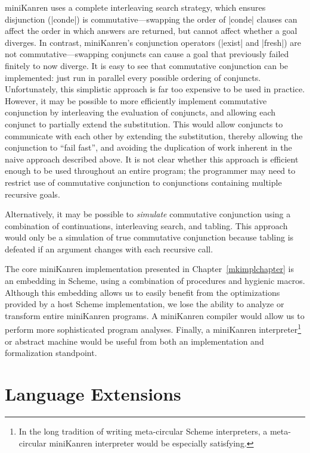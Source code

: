 miniKanren uses a complete interleaving search strategy, which ensures
disjunction (\scheme|conde|) is commutative---swapping the order of
\scheme|conde| clauses can affect the order in which answers are
returned, but cannot affect whether a goal diverges. In contrast,
miniKanren's conjunction operators (\scheme|exist| and \scheme|fresh|)
are not commutative---swapping conjuncts can cause a goal that
previously failed finitely to now diverge.  It is easy to see that
commutative conjunction can be implemented: just run in parallel every
possible ordering of conjuncts. Unfortunately, this simplistic
approach is far too expensive to be used in practice. However, it may
be possible to more efficiently implement commutative conjunction by
interleaving the evaluation of conjuncts, and allowing each conjunct
to partially extend the substitution. This would allow conjuncts to
communicate with each other by extending the substitution, thereby
allowing the conjunction to ``fail fast'', and avoiding the
duplication of work inherent in the naive approach described above.
It is not clear whether this approach is efficient enough to be used
throughout an entire program; the programmer may need to restrict use
of commutative conjunction to conjunctions containing multiple
recursive goals.

Alternatively, it may be possible to \emph{simulate} commutative
conjunction using a combination of continuations, interleaving search,
and tabling.  This approach would only be a simulation of true
commutative conjunction because tabling is defeated if an argument
changes with each recursive call.

The core miniKanren implementation presented in
Chapter~\ref{mkimplchapter} is an embedding in Scheme, using a
combination of procedures and hygienic macros.  Although this
embedding allows us to easily benefit from the optimizations provided
by a host Scheme implementation, we lose the ability to analyze or
transform entire miniKanren programs. A miniKanren compiler would
allow us to perform more sophisticated program analyses. Finally, a
miniKanren interpreter\footnote{In the long tradition of writing
  meta-circular Scheme interpreters, a meta-circular miniKanren
  interpreter would be especially satisfying.} or abstract machine
would be useful from both an implementation and formalization
standpoint.


\section{Language Extensions}\label{futureextensions}

